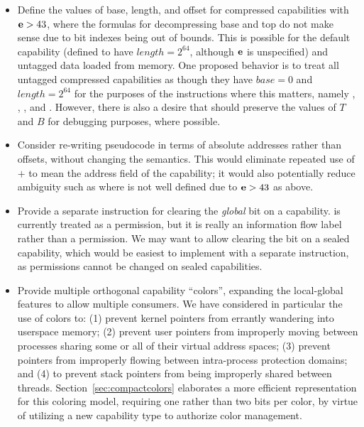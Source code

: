 \begin{itemize}
\item
  Define the values of base, length, and offset for compressed
  capabilities with ${\bf e}{} > 43$, where the formulas for
  decompressing base and top do not make sense due to bit indexes
  being out of bounds.  This is possible for the default capability
  (defined to have $length = 2^{64}$, although ${\bf e}{}$ is
  unspecified) and untagged data loaded from memory. One proposed
  behavior is to treat all untagged compressed capabilities as though
  they have $base=0$ and $length=2^{64}$ for the purposes of the
  instructions where this matters, namely ,
  , ,
   and .
  However, there is also a desire that  should preserve
    the values of $T$ and $B$ for debugging purposes, where possible.

\item
  Consider re-writing pseudocode in terms of absolute addresses rather
  than offsets, without changing the semantics. This would eliminate
  repeated use of \cbase{} $+$ \coffset{} to mean the address field of the
  capability; it would also potentially reduce ambiguity such as where
  \cbase{} is not well defined due to ${\bf e}{} > 43$ as above.

\item
  Provide a separate instruction for clearing the \emph{global} bit on a
  capability.  \cappermG is currently treated as a permission, but it is
  really an information flow label rather than a permission. We may want to
  allow clearing the \cappermG bit on a sealed capability, which would
  be easiest to implement with a separate instruction, as permissions cannot
  be changed on sealed capabilities.

\item
  Provide multiple orthogonal capability ``colors'', expanding the
  local-global features to allow multiple consumers.
  We have considered in particular the use of colors to: (1) prevent kernel
  pointers from errantly wandering into userspace memory; (2) prevent user
  pointers from improperly moving between processes sharing some or all of
  their virtual address spaces; (3) prevent pointers from improperly flowing
  between intra-process protection domains; and (4) to prevent stack pointers
  from being improperly shared between threads.
  Section~\ref{sec:compactcolors} elaborates a more efficient representation
  for this coloring model, requiring one rather than two bits per color, by
  virtue of utilizing a new capability type to authorize color management.


\end{itemize}
